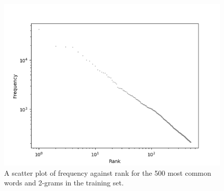 \documentclass[12pt,a4paper,twoside,openright]{report}
\begin{document}
\begin{figure}
	\begin{center}
		\includegraphics[scale=1]{figs/zipf.png}
	\end{center}
	\caption{A scatter plot of frequency against rank for the 500 most common words and 2-grams in the training set.}
	\label{fig:zipf}
\end{figure}
\end{document}
